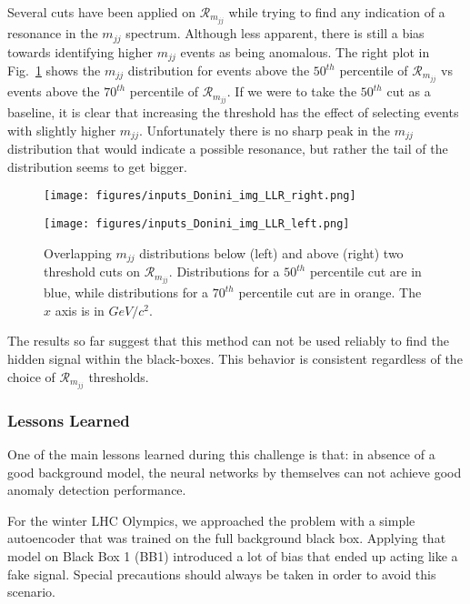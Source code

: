 \documentclass[a4paper,11pt]{article}
\begin{document}
Several cuts have been applied on $\mathcal{R}_{m_{jj}}$ while trying to find any indication of a resonance in the $m_{jj}$ spectrum. Although less apparent, there is still a bias towards identifying higher $m_{jj}$ events as being anomalous. The right plot in Fig.~\ref{fig:fig3} shows the $m_{jj}$ distribution for events above the $50^{th}$ percentile of $\mathcal{R}_{m_{jj}}$ vs events above the $70^{th}$ percentile of $\mathcal{R}_{m_{jj}}$. If we were to take the $50^{th}$ cut as a baseline, it is clear that increasing the threshold has the effect of selecting events with slightly higher $m_{jj}$. Unfortunately there is no sharp peak in the $m_{jj}$ distribution that would indicate a possible resonance, but rather the tail of the distribution seems to get bigger.

\begin{figure}[h!]
    \centering
    \begin{minipage}[b]{.5\textwidth}
        \centering
        \texttt{[image: figures/inputs\_Donini\_img\_LLR\_right.png]}
\end{minipage}\begin{minipage}[b]{.5\textwidth}
        \centering
        \texttt{[image: figures/inputs\_Donini\_img\_LLR\_left.png]}
\end{minipage}
    \label{fig:fig3}
    \caption{Overlapping $m_{jj}$ distributions below (left) and above (right) two threshold cuts on $\mathcal{R}_{m_{jj}}$. Distributions for a $50^{th}$ percentile cut are in blue, while  distributions for a $70^{th}$ percentile cut are in orange. The $x$ axis is in $GeV/c^2$.}
\end{figure}

The results so far suggest that this method can not be used reliably to find the hidden signal within the black-boxes. This behavior is consistent regardless of the choice of $\mathcal{R}_{m_{jj}}$ thresholds.




\subsubsection{Lessons Learned}
\label{sec:lessons}

One of the main lessons learned during this challenge is that: in absence of a good background model, the neural networks by themselves can not achieve good anomaly detection performance. 

For the winter LHC Olympics, we approached the problem with a simple autoencoder that was trained on the full background black box. Applying that model on Black Box 1 (BB1) introduced a lot of bias that ended up acting like a fake signal. Special precautions should always be taken in order to avoid this scenario.
\end{document}
